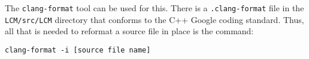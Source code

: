 \documentclass{article}
\begin{document}
The \verb+clang-format+ tool can be used for this. There is a
\verb+.clang-format+ file in the \verb+LCM/src/LCM+ directory that conforms
to the C++ Google coding standard. Thus, all that is needed to reformat a
source file in place is the command:
\begin{verbatim}
clang-format -i [source file name]
\end{verbatim}
\end{document}
